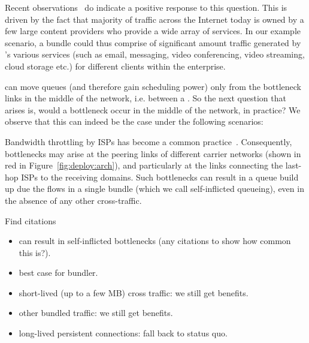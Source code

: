 Recent observations~\cite{fivecomps}  do indicate a positive response to this question. This is driven by the fact that majority of traffic across the Internet today is owned by a few large content providers who provide a wide array of services. In our example scenario, a bundle could thus comprise of significant amount traffic generated by \egsender's various services (such as email, messaging, video conferencing, video streaming, cloud storage etc.) for different clients within the enterprise.




 \name can move queues (and therefore gain scheduling power) only from the bottleneck links in the middle of the network, i.e. between a \pair. So the next question that arises is, would a bottleneck occur in the middle of the network, in practice? We observe that this can indeed be the case under the following scenarios:

 Bandwidth throttling by ISPs has become a common practice~\cite{isp-throttle-1, isp-throttle-2, isp-throttle-3}. Consequently, bottlenecks may arise at the peering links of different carrier networks (shown in red in Figure~\ref{fig:deploy:arch}), and particularly at the links connecting the last-hop ISPs to the receiving domains. Such bottlenecks can result in a queue build up due the flows in a single bundle (which we call self-inflicted queueing), even in the absence of any other cross-traffic. 

Find citations
\begin{itemize}
    \item can result in self-inflicted bottlenecks (any citations to show how common this is?).
    \item best case for bundler.
\end{itemize}

\begin{itemize}
    \item short-lived (up to a few MB) cross traffic: we still get benefits.
    \item other bundled traffic: we still get benefits.
    \item long-lived persistent connections: fall back to status quo.
\end{itemize}

